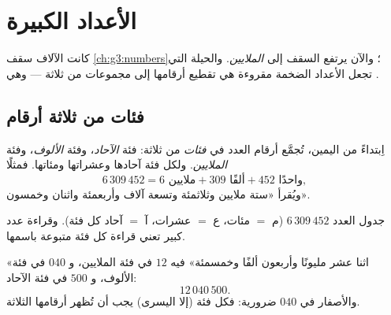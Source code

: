 \chapter{الأعداد الكبيرة}\label{ch:g4:numbers}

كانت الآلاف سقف \cref{ch:g3:numbers}؛ والآن يرتفع السقف إلى
\emph{الملايين}. والحيلة التي تجعل الأعداد الضخمة مقروءة هي
تقطيع أرقامها إلى مجموعات من ثلاثة --- وهي .

\section{فئات من ثلاثة أرقام}

\begin{definition}[الفئات]\label{def:g4:numbers:classes}
اِبتداءً من اليمين، تُجمَّع أرقام العدد في \emph{فئات} من
ثلاثة: فئة \emph{الآحاد}، وفئة \emph{الألوف}، وفئة
\emph{الملايين}. ولكل فئة آحادها وعشراتها ومئاتها.
فمثلًا
\[
6\,309\,452 = 6 \text{ ملايين} + 309 \text{ ألفًا}
+ 452 \text{ واحدًا},
\]
ويُقرأ «ستة ملايين وثلاثمئة وتسعة آلاف وأربعمئة
واثنان وخمسون».
\end{definition}

\begin{omfigure}

{\small جدول  العدد $6\,309\,452$ (م $=$ مئات، ع $=$
عشرات، آ $=$ آحاد كل فئة). وقراءة عدد كبير تعني
قراءة كل فئة متبوعة باسمها.}
\end{omfigure}

\begin{example}\label{ex:g4:numbers:write}
«اثنا عشر مليونًا وأربعون ألفًا وخمسمئة» فيه $12$ في
فئة الملايين، و $040$ في فئة الألوف، و $500$ في فئة
الآحاد:
\[
12\,040\,500 .
\]
والأصفار في $040$ ضرورية: فكل فئة (إلا اليسرى) يجب أن تُظهر
أرقامها الثلاثة.
\end{example}


